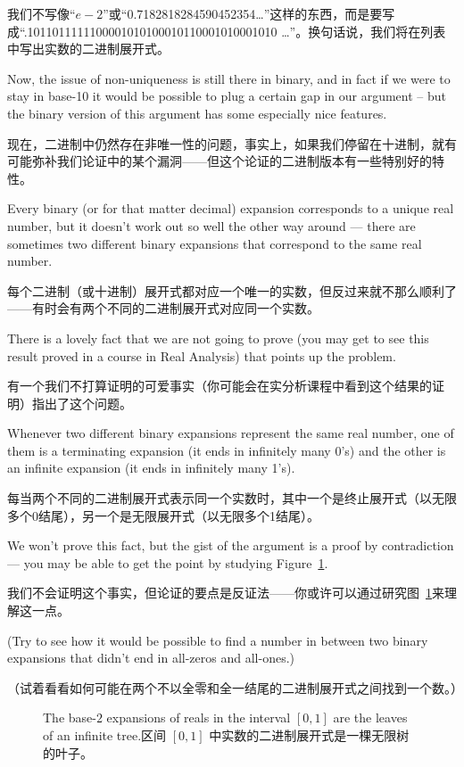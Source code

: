 我们不写像“$e-2$”或“0.7182818284590452354\ldots”这样的东西，而是要写成“.1011011111100001010100010110001010001010 \ldots”。换句话说，我们将在列表中写出实数的二进制展开式。

Now, the issue of non-uniqueness is still there in binary, and
in fact if we were to stay in base-10 it would be possible to plug a certain
gap in our argument -- but the binary version of this argument has some
especially nice features.

现在，二进制中仍然存在非唯一性的问题，事实上，如果我们停留在十进制，就有可能弥补我们论证中的某个漏洞——但这个论证的二进制版本有一些特别好的特性。

Every binary (or for that matter decimal) expansion corresponds to a unique
real number, but it doesn't work out so well the other way around ---
there are sometimes two different binary expansions that correspond to the
same real number.

每个二进制（或十进制）展开式都对应一个唯一的实数，但反过来就不那么顺利了——有时会有两个不同的二进制展开式对应同一个实数。

There is a lovely fact that we are not going to prove (you
may get to see this result proved in a course in Real Analysis) that points up
the problem.

有一个我们不打算证明的可爱事实（你可能会在实分析课程中看到这个结果的证明）指出了这个问题。

Whenever two different binary expansions represent the same
real number, one of them is a terminating expansion (it ends in infinitely
many 0's) and the other is an infinite expansion (it ends in infinitely many
1's).

每当两个不同的二进制展开式表示同一个实数时，其中一个是终止展开式（以无限多个0结尾），另一个是无限展开式（以无限多个1结尾）。

We won't prove this fact, but the gist of the argument is a proof by
contradiction --- you may be able to get the point by studying Figure~\ref{fig:binary_reps}.

我们不会证明这个事实，但论证的要点是反证法——你或许可以通过研究图~\ref{fig:binary_reps}来理解这一点。

(Try to see how it would be possible to find a number in between two binary
expansions that didn't end in all-zeros and all-ones.)

（试着看看如何可能在两个不以全零和全一结尾的二进制展开式之间找到一个数。）

\begin{figure}[!hbtp]
    
    \caption[Binary representations in the unit interval.单位区间内的二进制表示。]{The base-$2$ %
        expansions of reals in the interval $[0, 1]$ are the leaves of an %
        infinite tree.区间 $[0, 1]$ 中实数的二进制展开式是一棵无限树的叶子。}
    \label{fig:binary_reps}
\end{figure}

